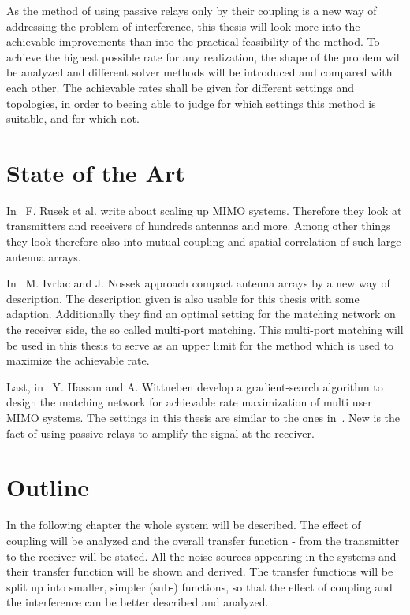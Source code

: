 As the method of using passive relays only by their coupling is a new way of addressing the problem of interference, this thesis will look more into the achievable improvements than into the practical feasibility of the method.
To achieve the highest possible rate for any realization, the shape of the problem will be analyzed and different solver methods will be introduced and compared with each other.
The achievable rates shall be given for different settings and topologies, in order to beeing able to judge for which settings this method is suitable, and for which not.

\section{State of the Art}
\label{sec:SoA}

In~\cite{rusek13} F. Rusek et al. write about scaling up MIMO systems.
Therefore they look at transmitters and receivers of hundreds antennas and more.
Among other things they look therefore also into mutual coupling and spatial correlation of such large antenna arrays.

In~\cite{Nossek} M. Ivrlac and J. Nossek approach compact antenna arrays by a new way of description.
The description given is also usable for this thesis with some adaption.
Additionally they find an optimal setting for the matching network on the receiver side, the so called multi-port matching.
This multi-port matching will be used in this thesis to serve as an upper limit for the method which is used to maximize the achievable rate.

Last, in~\cite{Yahia2013} Y. Hassan and A. Wittneben develop a gradient-search algorithm to design the matching network for achievable rate maximization of multi user MIMO systems.
The settings in this thesis are similar to the ones in~\cite{Yahia2013}.
New is the fact of using passive relays to amplify the signal at the receiver.




\section{Outline}
\label{sec:outline}

In the following chapter the whole system will be described.
The effect of coupling will be analyzed and the overall transfer function - from the transmitter to the receiver will be stated.
All the noise sources appearing in the systems and their transfer function will be shown and derived.
The transfer functions will be split up into smaller, simpler (sub-) functions, so that the effect of coupling and the interference can be better described and analyzed.

